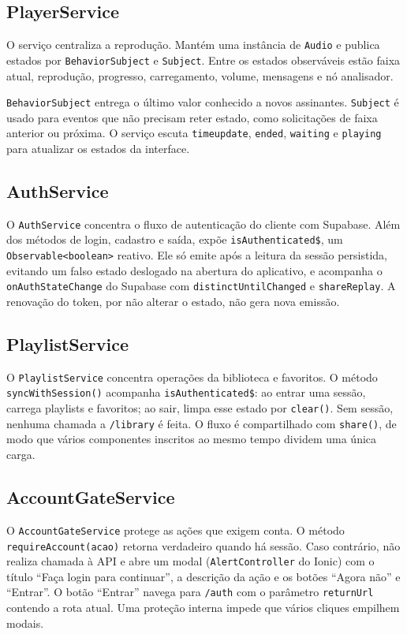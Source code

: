 \documentclass[12pt,a4paper,oneside]{report}
\newcommand{\arquivo}[1]{\texttt{\detokenize{#1}}}
\begin{document}
\subsection{PlayerService}
O serviço \arquivo{src/app/core/services/player.service.ts} centraliza a reprodução. Mantém uma instância de \texttt{Audio} e publica estados por \texttt{BehaviorSubject} e \texttt{Subject}. Entre os estados observáveis estão faixa atual, reprodução, progresso, carregamento, volume, mensagens e nó analisador.

\texttt{BehaviorSubject} entrega o último valor conhecido a novos assinantes. \texttt{Subject} é usado para eventos que não precisam reter estado, como solicitações de faixa anterior ou próxima. O serviço escuta \texttt{timeupdate}, \texttt{ended}, \texttt{waiting} e \texttt{playing} para atualizar os estados da interface.

\subsection{AuthService}
O \texttt{AuthService} concentra o fluxo de autenticação do cliente com Supabase. Além dos métodos de login, cadastro e saída, expõe \texttt{isAuthenticated\$}, um \texttt{Observable<boolean>} reativo. Ele só emite após a leitura da sessão persistida, evitando um falso estado deslogado na abertura do aplicativo, e acompanha o \texttt{onAuthStateChange} do Supabase com \texttt{distinctUntilChanged} e \texttt{shareReplay}. A renovação do token, por não alterar o estado, não gera nova emissão.

\subsection{PlaylistService}
O \texttt{PlaylistService} concentra operações da biblioteca e favoritos. O método \texttt{syncWithSession()} acompanha \texttt{isAuthenticated\$}: ao entrar uma sessão, carrega playlists e favoritos; ao sair, limpa esse estado por \texttt{clear()}. Sem sessão, nenhuma chamada a \texttt{/library} é feita. O fluxo é compartilhado com \texttt{share()}, de modo que vários componentes inscritos ao mesmo tempo dividem uma única carga.

\subsection{AccountGateService}
O \texttt{AccountGateService} protege as ações que exigem conta. O método \texttt{requireAccount(acao)} retorna verdadeiro quando há sessão. Caso contrário, não realiza chamada à API e abre um modal (\texttt{AlertController} do Ionic) com o título ``Faça login para continuar'', a descrição da ação e os botões ``Agora não'' e ``Entrar''. O botão ``Entrar'' navega para \texttt{/auth} com o parâmetro \texttt{returnUrl} contendo a rota atual. Uma proteção interna impede que vários cliques empilhem modais.
\end{document}
